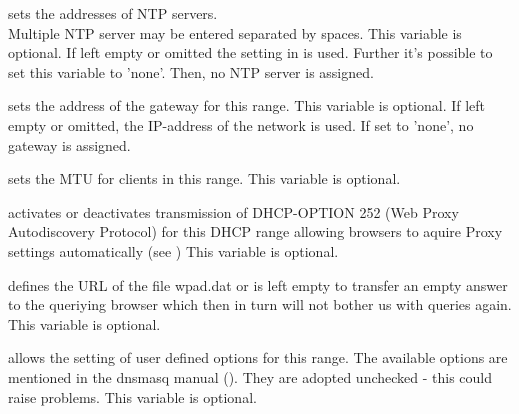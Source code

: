 \begin{description}

    {sets the addresses of NTP servers. \\
    Multiple NTP server may be entered separated by spaces.
    This variable is optional. If left empty or omitted
    the setting in  is used. 
    Further it's possible to set this variable to 'none'. Then, no NTP server is assigned.}


    {sets the address of the gateway for this range.
    This variable is optional. If left empty or omitted, the IP-address of the 
    network is used.
    If set to 'none', no gateway is assigned.}


    {sets the MTU for clients in this range.
    This variable is optional.}


     {activates or deactivates transmission of DHCP-OPTION 252 (Web Proxy Autodiscovery Protocol)
     for this DHCP range allowing browsers to aquire Proxy settings automatically
     (see )
     This variable is optional.
     }


     {defines the URL of the file wpad.dat or is left empty to transfer an empty answer to
     the queriying browser which then in turn will not bother us with queries again.
     This variable is optional.
     }


    {allows the setting of user defined options for this range. The available options
    are mentioned in the dnsmasq manual ().
    They are adopted unchecked - this could raise problems.
    This variable is optional.}


\end{description}
